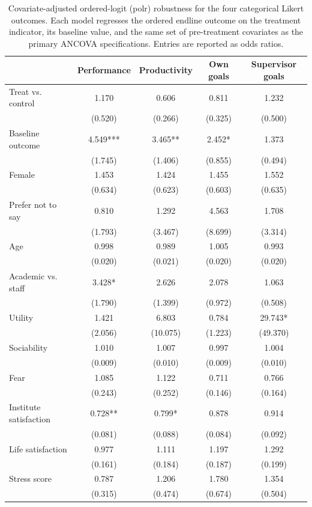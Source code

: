 \begin{table}
\centering
\caption{Covariate-adjusted ordered-logit (polr) robustness for the four categorical Likert outcomes. Each model regresses the ordered endline outcome on the treatment indicator, its baseline value, and the same set of pre-treatment covariates as the primary ANCOVA specifications. Entries are reported as odds ratios.\label{tab:orderedlogit-cov}}
\centering
\begin{tabular}[t]{lcccc}
\toprule
  & Performance & Productivity & Own goals & Supervisor goals\\
\midrule
Treat vs. control & 1.170 & 0.606 & 0.811 & 1.232\\
 & (0.520) & (0.266) & (0.325) & (0.500)\\
Baseline outcome & 4.549*** & 3.465** & 2.452* & 1.373\\
 & (1.745) & (1.406) & (0.855) & (0.494)\\
Female & 1.453 & 1.424 & 1.455 & 1.552\\
 & (0.634) & (0.623) & (0.603) & (0.635)\\
Prefer not to say & 0.810 & 1.292 & 4.563 & 1.708\\
 & (1.793) & (3.467) & (8.699) & (3.314)\\
Age & 0.998 & 0.989 & 1.005 & 0.993\\
 & (0.020) & (0.021) & (0.020) & (0.020)\\
Academic vs. staff & 3.428* & 2.626 & 2.078 & 1.063\\
 & (1.790) & (1.399) & (0.972) & (0.508)\\
Utility & 1.421 & 6.803 & 0.784 & 29.743*\\
 & (2.056) & (10.075) & (1.223) & (49.370)\\
Sociability & 1.010 & 1.007 & 0.997 & 1.004\\
 & (0.009) & (0.010) & (0.009) & (0.010)\\
Fear & 1.085 & 1.122 & 0.711 & 0.766\\
 & (0.243) & (0.252) & (0.146) & (0.164)\\
Institute satisfaction & 0.728** & 0.799* & 0.878 & 0.914\\
 & (0.081) & (0.088) & (0.084) & (0.092)\\
Life satisfaction & 0.977 & 1.111 & 1.197 & 1.292\\
 & (0.161) & (0.184) & (0.187) & (0.199)\\
Stress score & 0.787 & 1.206 & 1.780 & 1.354\\
 & (0.315) & (0.474) & (0.674) & (0.504)\\

\end{tabular}
\end{table}
